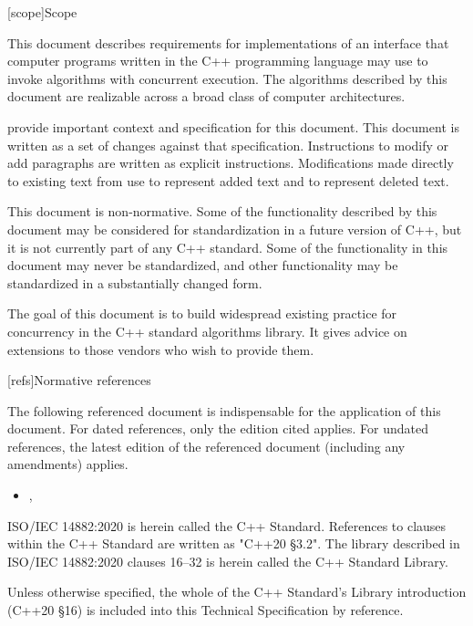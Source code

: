 
[scope]{Scope}

\pnum
This document describes requirements for implementations of an interface that computer programs written in the C++ programming language may use to invoke algorithms with concurrent execution. The algorithms described by this document are realizable across a broad class of computer architectures.

\pnum
{\cppstddocno} provide important context and specification for
this document. This document is written as a set of changes against that specification.  Instructions to modify or add paragraphs are written as
explicit instructions.  Modifications made directly to existing text from {\cppstddocno} use  to represent added text and  to represent deleted text.

\pnum
This document is non-normative. Some of the functionality described by this document may be considered for standardization in a future version of C++, but it is not currently part of any C++ standard. Some of the functionality in this document may never be standardized, and other functionality may be standardized in a substantially changed form.

\pnum
The goal of this document is to build widespread existing practice for concurrency in the C++ standard algorithms library. It gives advice on extensions to those vendors who wish to provide them.

[refs]{Normative references}

\pnum
The following referenced document is indispensable for the application of this document. For dated references, only the edition cited applies. For undated references, the latest edition of the referenced document (including any amendments) applies.

\begin{itemize}
\item {\cppstddocno}, 
\end{itemize}

\pnum
ISO/IEC 14882:2020 is herein called the C++ Standard. References to clauses within the C++ Standard are written as "C++20 §3.2". The library described in ISO/IEC 14882:2020 clauses 16–32 is herein called the C++ Standard Library.

\pnum
Unless otherwise specified, the whole of the C++ Standard's Library introduction (C++20 §16) is included into this Technical Specification by reference.


